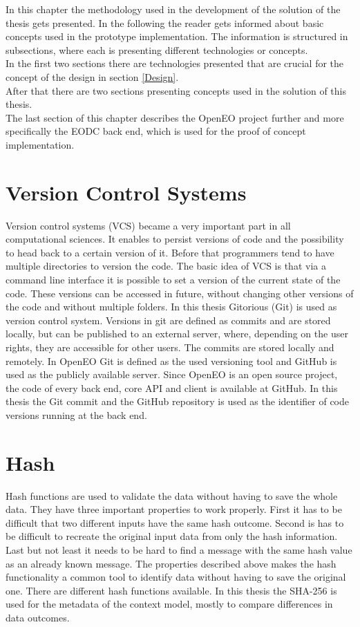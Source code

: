 \documentclass[draft,final]{vutinfth} %
\begin{document}
In this chapter the methodology used in the development of the solution of the thesis gets presented. In the following the reader gets informed about basic concepts used in the prototype implementation. The information is structured in subsections, where each is presenting different technologies or concepts. \\In the first two sections there are technologies presented that are crucial for the concept of the design in section \ref{Design}.\\
After that there are two sections presenting concepts used in the solution of this thesis. \\
The last section of this chapter describes the OpenEO project further and more specifically the EODC back end, which is used for the proof of concept implementation.    

\section{Version Control Systems}\label{Version Control Systems}
Version control systems (VCS) became a very important part in all computational sciences. It enables to persist versions of code and the possibility to head back to a certain version of it. Before that programmers tend to have multiple directories to version the code. The basic idea of VCS is that via a command line interface it is possible to set a version of the current state of the code. These versions can be accessed in future, without changing other versions of the code and without multiple folders. \cite{10.1109/MCSE.2009.194}
In this thesis Gitorious (Git) is used as version control system. Versions in git are defined as commits and are stored locally, but can be published to an external server, where, depending on the user rights, they are accessible for other users. The commits are stored locally and remotely. \cite{QuickGit} In OpenEO Git is defined as the used versioning tool and GitHub is used as the publicly available server. Since OpenEO is an open source project, the code of every back end, core API and client is available at GitHub. In this thesis the Git commit and the GitHub repository is used as the identifier of code versions running at the back end. 

\section{Hash}\label{Hash}
Hash functions are used to validate the data without having to save the whole data. They have three important properties to work properly. First it has to be difficult that two different inputs have the same hash outcome. Second is has to be difficult to recreate the original input data from only the hash information. Last but not least it needs to be hard to find a message with the same hash value as an already known message. The properties described above makes the hash functionality a common tool to identify data without having to save the original one. \cite{3b412889270f46f59740fbf1ca8cd7e0} There are different hash functions available. In this thesis the SHA-256 is used for the metadata of the context model, mostly to compare differences in data outcomes.
\end{document}
